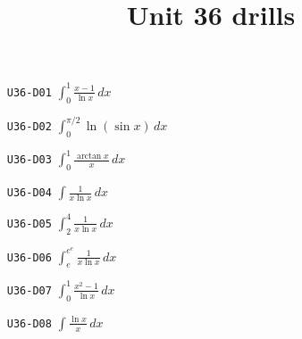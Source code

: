 \title{Unit 36 drills}\maketitle\begin{enumerate}
  \item[\texttt{U36-D01}] $\displaystyle \int_{0}^{1}\frac{x-1}{\ln x}\,dx$
  \item[\texttt{U36-D02}] $\displaystyle \int_{0}^{\pi/2}\ln(\sin x)\,dx$
  \item[\texttt{U36-D03}] $\displaystyle \int_{0}^{1}\frac{\arctan x}{x}\,dx$
  \item[\texttt{U36-D04}] $\displaystyle \int\frac{1}{x\ln x}\,dx$
  \item[\texttt{U36-D05}] $\displaystyle \int_{2}^{4}\frac{1}{x\ln x}\,dx$
  \item[\texttt{U36-D06}] $\displaystyle \int_{e}^{e^{e}}\frac{1}{x\ln x}\,dx$
  \item[\texttt{U36-D07}] $\displaystyle \int_{0}^{1}\frac{x^{2}-1}{\ln x}\,dx$
  \item[\texttt{U36-D08}] $\displaystyle \int\frac{\ln x}{x}\,dx$
\end{enumerate}
